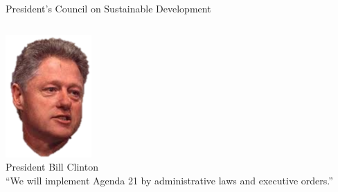 \begin{frame}{President's Council on Sustainable Development}
    \begin{columns}[onlytextwidth]
            \centering
            \includegraphics[width=.75\textwidth]{img/clinton.png} \\
            President Bill Clinton \\

            ``We will implement Agenda 21 by administrative laws and executive orders.''
    \end{columns}
\end{frame}


